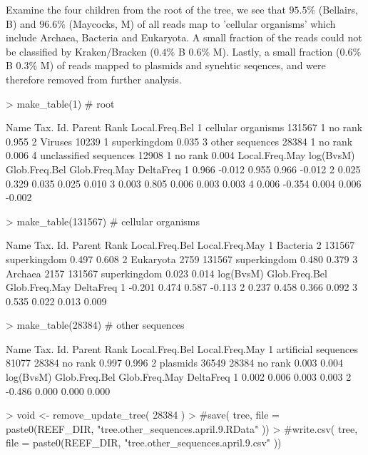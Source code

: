 \documentclass{article}
\begin{document}
Examine the four children from  the root of the tree, we see that $95.5\%$ (Bellairs, B) and $96.6\%$ (Maycocks, M) of all reads map to 'cellular organisms' which include Archaea, Bacteria and Eukaryota. 
A small fraction of the reads could not be classified by Kraken/Bracken ($0.4\%$ B $0.6\%$ M).
Lastly, a small fraction ($0.6\%$ B $0.3\%$ M) of reads mapped to plasmids and synehtic seqences, and
were therefore removed from further analysis.
\begin{Schunk}
\begin{Sinput}
> make_table(1)        # root
\end{Sinput}
\begin{Soutput}
                    Name Tax. Id. Parent         Rank Local.Freq.Bel
1     cellular organisms   131567      1      no rank          0.955
2                Viruses    10239      1 superkingdom          0.035
3        other sequences    28384      1      no rank          0.006
4 unclassified sequences    12908      1      no rank          0.004
  Local.Freq.May log(BvsM) Glob.Freq.Bel Glob.Freq.May DeltaFreq
1          0.966    -0.012         0.955         0.966    -0.012
2          0.025     0.329         0.035         0.025     0.010
3          0.003     0.805         0.006         0.003     0.003
4          0.006    -0.354         0.004         0.006    -0.002
\end{Soutput}
\begin{Sinput}
> make_table(131567)   # cellular organisms
\end{Sinput}
\begin{Soutput}
       Name Tax. Id. Parent         Rank Local.Freq.Bel Local.Freq.May
1  Bacteria        2 131567 superkingdom          0.497          0.608
2 Eukaryota     2759 131567 superkingdom          0.480          0.379
3   Archaea     2157 131567 superkingdom          0.023          0.014
  log(BvsM) Glob.Freq.Bel Glob.Freq.May DeltaFreq
1    -0.201         0.474         0.587    -0.113
2     0.237         0.458         0.366     0.092
3     0.535         0.022         0.013     0.009
\end{Soutput}
\begin{Sinput}
> make_table(28384)    # other sequences
\end{Sinput}
\begin{Soutput}
                  Name Tax. Id. Parent    Rank Local.Freq.Bel Local.Freq.May
1 artificial sequences    81077  28384 no rank          0.997          0.996
2             plasmids    36549  28384 no rank          0.003          0.004
  log(BvsM) Glob.Freq.Bel Glob.Freq.May DeltaFreq
1     0.002         0.006         0.003     0.003
2    -0.486         0.000         0.000     0.000
\end{Soutput}
\begin{Sinput}
> void <- remove_update_tree( 28384 )
> #save( tree, file = paste0(REEF_DIR, "tree.other_sequences.april.9.RData" ))
> #write.csv( tree, file = paste0(REEF_DIR, "tree.other_sequences.april.9.csv" ))
\end{Sinput}
\end{Schunk}
\end{document}
